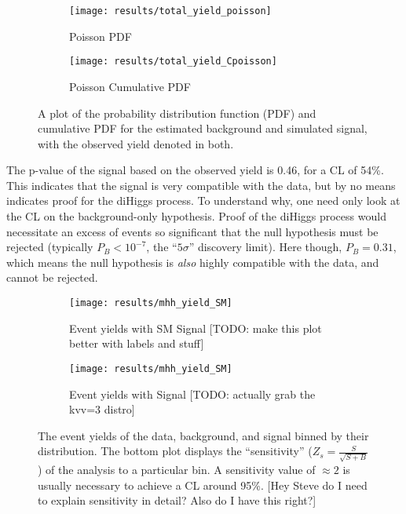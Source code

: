     \begin{figure}
        \centering
        \begin{subfigure}{0.48\textwidth} 
            \texttt{[image: results/total\_yield\_poisson]}
            \caption{Poisson PDF}
            \label{fig:poisson_sig:pdf}
        \end{subfigure}
        \begin{subfigure}{0.48\textwidth}
            \texttt{[image: results/total\_yield\_Cpoisson]}
            \caption{Poisson Cumulative PDF}
            \label{fig:poisson_sig:Cpdf}
        \end{subfigure}
        \caption{
            A plot of the probability distribution function (PDF)
                and cumulative PDF for the estimated background and simulated signal,
                with the observed yield denoted in both.
        }
    \end{figure}

    The p-value of the signal based on the observed yield is 0.46,
        for a CL of 54\%.
    This indicates that the signal is very compatible with the data,
        but by no means indicates proof for the diHiggs process.
    To understand why, one need only look at the CL on the background-only hypothesis.
    Proof of the diHiggs process would necessitate an excess of events so significant that
        the null hypothesis must be rejected (typically $P_B < 10^{-7}$, the ``$5\sigma$'' discovery limit).
    Here though, $P_B = 0.31$, which means the null hypothesis is \textit{also} highly compatible with the data,
        and cannot be rejected.

    \begin{figure}
        \centering
        \begin{subfigure}{0.48\textwidth} 
            \texttt{[image: results/mhh\_yield\_SM]}
            \caption{Event yields with SM Signal [TODO: make this plot better with labels and stuff]}
            \label{fig:mhh_yield:kvv1}
        \end{subfigure}
        \begin{subfigure}{0.48\textwidth}
            \texttt{[image: results/mhh\_yield\_SM]}
            \caption{Event yields with Signal  [TODO: actually grab the kvv=3 distro]}
            \label{fig:mhh_yield:kvv3}
        \end{subfigure}
        \caption{
            The event yields of the data, background, and signal binned by their \mhh distribution.
            The bottom plot displays the ``sensitivity'' ($Z_s=\frac{S}{\sqrt{S+B}}$)
                of the analysis to a particular \mhh bin.
            A sensitivity value of $\approx 2$ is usually necessary to achieve a CL around 95\%.
            [Hey Steve do I need to explain sensitivity in detail? Also do I have this right?]
        }
    \end{figure}


